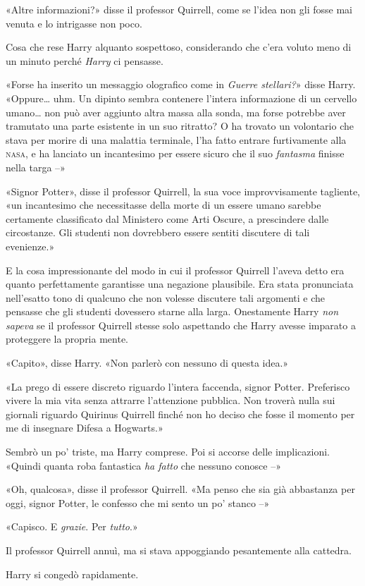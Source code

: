 «Altre informazioni?» disse il professor Quirrell, come se l’idea non gli fosse mai venuta e lo intrigasse non poco.

Cosa che rese Harry alquanto sospettoso, considerando che c’era voluto meno di un minuto perché \textit{Harry} ci pensasse.

«Forse ha inserito un messaggio olografico come in \textit{Guerre stellari?}» disse Harry. «Oppure… uhm. Un dipinto sembra contenere l’intera informazione di un cervello umano… non può aver aggiunto altra massa alla sonda, ma forse potrebbe aver tramutato una parte esistente in un suo ritratto? O ha trovato un volontario che stava per morire di una malattia terminale, l’ha fatto entrare furtivamente alla \textsc{nasa}, e ha lanciato un incantesimo per essere sicuro che il suo \textit{fantasma} finisse nella targa –»

«Signor Potter», disse il professor Quirrell, la sua voce improvvisamente tagliente, «un incantesimo che necessitasse della morte di un essere umano sarebbe certamente classificato dal Ministero come Arti Oscure, a prescindere dalle circostanze. Gli studenti non dovrebbero essere sentiti discutere di tali evenienze.»

E la cosa impressionante del modo in cui il professor Quirrell l’aveva detto era quanto perfettamente garantisse una negazione plausibile. Era stata pronunciata nell’esatto tono di qualcuno che non volesse discutere tali argomenti e che pensasse che gli studenti dovessero starne alla larga. Onestamente Harry \textit{non sapeva} se il professor Quirrell stesse solo aspettando che Harry avesse imparato a proteggere la propria mente.

«Capito», disse Harry. «Non parlerò con nessuno di questa idea.»

«La prego di essere discreto riguardo l’intera faccenda, signor Potter. Preferisco vivere la mia vita senza attrarre l’attenzione pubblica. Non troverà nulla sui giornali riguardo Quirinus Quirrell finché non ho deciso che fosse il momento per me di insegnare Difesa a Hogwarts.»

Sembrò un po’ triste, ma Harry comprese. Poi si accorse delle implicazioni. «Quindi quanta roba fantastica \textit{ha fatto} che nessuno conosce –»

«Oh, qualcosa», disse il professor Quirrell. «Ma penso che sia già abbastanza per oggi, signor Potter, le confesso che mi sento un po’ stanco –»

«Capisco. E \textit{grazie}. Per \textit{tutto}.»

Il professor Quirrell annuì, ma si stava appoggiando pesantemente alla cattedra.

Harry si congedò rapidamente.

